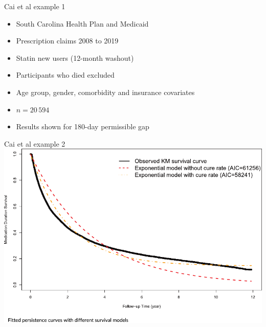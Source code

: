 \documentclass[aspectratio=169,12pt]{beamer} %
\begin{document}
\begin{frame}{Cai et al example 1}
	\begin{itemize}
		\item South Carolina Health Plan and Medicaid
		\item Prescription claims 2008 to 2019
		\item Statin new users (12-month washout)
		\item Participants who died excluded
		\item Age group, gender, comorbidity and insurance covariates
		\item $n=20\,594$
		\item Results shown for 180-day permissible gap
	\end{itemize}
\end{frame}

\begin{frame}{Cai et al example 2}
  \centering
  \includegraphics[height=0.7\textheight]{ref/cai_fig2.pdf}
\end{frame}
\end{document}
